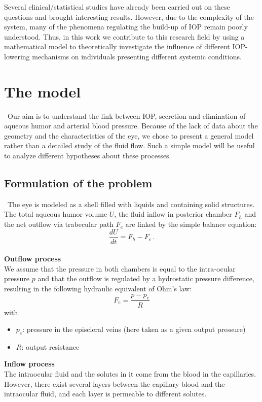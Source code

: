 \documentclass[english,12pt]{article}
\begin{document}
Several clinical/statistical studies have already been carried out on these questions and brought interesting results. However, due to the complexity of the system, many of the phenomena regulating the build-up of IOP remain poorly understood. Thus, in this work we contribute to this research field by using a mathematical model to theoretically investigate the influence of different IOP-lowering mechanisms on individuals presenting different systemic conditions.
 
\section{The model}\label{s3}\
\indent Our aim is to understand the link between IOP, secretion and elimination of aqueous humor and arterial blood pressure.
Because of the lack of data about the geometry and the characteristics of the eye, we chose to present a general model rather than a detailed study of the fluid flow. Such a simple model will be useful to analyze different hypotheses about these processes.
\subsection{Formulation of the problem}\
\indent The eye is modeled as a shell filled with liquids and containing solid structures. 
 The total aqueous humor volume $U$, 
 the fluid inflow in posterior chamber $F_h$ and
 the net outflow via trabecular path $F_e$ are linked by the simple balance equation:
\begin{equation}
\frac{dU}{dt}=F_{h}-F_{e}\,.
\label{e1}
\end{equation}
\\
\textbf{Outflow process}\\
We assume that the pressure in both chambers is equal to the intra-ocular pressure $p$ and that the outflow is regulated by a hydrostatic pressure difference, resulting in the following hydraulic equivalent of Ohm's law:
\begin{equation}
F_{e}= \frac{p-p_{e}}{R}
\label{e2}
\end{equation}
with
\begin{itemize}
\item $p_e$: pressure in the episcleral veins (here taken as a given output pressure)
\item $R$: output resistance
\end{itemize}
\textbf{Inflow process}\\
The intraocular fluid and the solutes in it come from the blood in the capillaries. However, there exist several layers between the capillary blood and the intraocular fluid, and each layer is permeable to different solutes. 
\end{document}
